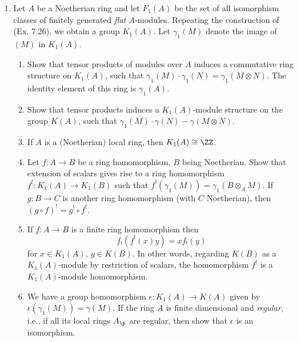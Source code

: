 \documentclass[12pt]{amsart}
\begin{document}
\begin{enumerate}
  \item[7.27] {
      Let $A$ be a Noetherian ring and let $F_1(A)$ be the set of all isomorphism classes of finitely generated \emph{flat} $A$-modules.
      Repeating the construction of (Ex. 7.26), we obtain a group $K_1(A)$.
      Let $\gamma_1(M)$ denote the image of $(M)$ in $K_1(A)$.
      \begin{enumerate}
        \item Show that tensor products of modules over $A$ induces a commutative ring structure on $K_1(A)$, such that $\gamma_1(M)\cdot\gamma_1(N)=\gamma_1(M\otimes N)$.
          The identity element of this ring is $\gamma_1(A)$.
        \item Show that tensor products induces a $K_1(A)$-module structure on the group $K(A)$, such that $\gamma_1(M)\cdot \gamma(N)-\gamma(M\otimes N)$.
        \item If $A$ is a (Noetherian) local ring, then $K_1(A)\cong \ZZ$.
        \item Let $f:A\to B$ be a ring homomorphism, $B$ being Noetherian.
          Show that extension of scalars gives rise to a ring homomorphism $f^!:K_1(A)\to K_1(B)$ such that $f^!(\gamma_1(M))=\gamma_1(B\otimes_A M)$.
          If $g:B\to C$ is another ring homomorphism (with $C$ Noetherian), then $(g\circ f)^!=g^!\circ f^!$.
        \item If $f:A\to B$ is a finite ring homomorphism then
          \[
            f_!(f^!(x)y)=xf_!(y)
          \] 
          for $x\in K_1(A)$, $y\in K(B)$.
          In other words, regarding $K(B)$ as a $K_1(A)$-module by restriction of scalars, the homomorphism $f^!$ is a $K_1(A)$-module homomorphism.
        \item We have a group homomorphism $\epsilon:K_1(A)\to K(A)$ given by $\epsilon(\gamma_1(M))=\gamma(M)$.
          If the ring $A$ is finite dimensional and \emph{regular}, i.e., if all its local rings $A_\p$ are regular, then show that $\epsilon$ is an isomorphism.
      \end{enumerate}
    }
\end{enumerate}
\end{document}

